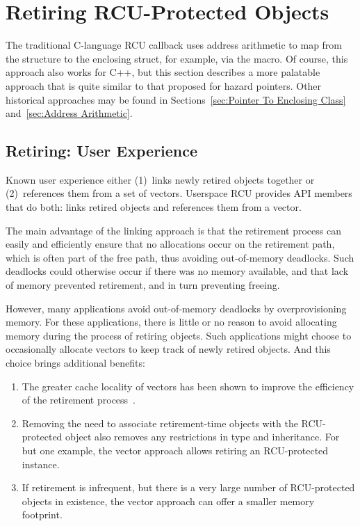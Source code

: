 \documentclass[letterpaper,10pt]{article}
\begin{document}
\section{Retiring RCU-Protected Objects}
\label{sec:Retiring RCU-Protected Objects}

The traditional C-language RCU callback uses address arithmetic
to map from the  structure to the enclosing struct,
for example, via the  macro.
Of course, this approach also works for C++, but this section describes
a more palatable approach that is quite similar to that proposed for
hazard pointers.
Other historical approaches may be found in
Sections~\ref{sec:Pointer To Enclosing Class}
and~\ref{sec:Address Arithmetic}.

\subsection{Retiring: User Experience}
\label{sec:Retiring: User Experience}

Known user experience either (1)~links newly retired
objects together or (2)~references them from a set of vectors.
Userspace RCU provides API members that do both:  
links retired objects and  references them from a
vector.

The main advantage of the linking approach is that the retirement
process can easily and efficiently ensure that no allocations occur on
the retirement path, which is often part of the free path, thus avoiding
out-of-memory deadlocks.
Such deadlocks could otherwise occur if there was no memory available,
and that lack of memory prevented retirement, and in turn preventing freeing.

However, many applications avoid out-of-memory deadlocks by overprovisioning
memory.
For these applications, there is little or no reason to avoid allocating
memory during the process of retiring objects.
Such applications might choose to occasionally allocate vectors to
keep track of newly retired objects.
And this choice brings additional benefits:

\begin{enumerate}
\item	The greater cache locality of vectors has been shown to
	improve the efficiency of the retirement
	process~\cite{MathieuDesnoyers2012URCU}.
\item	Removing the need to associate retirement-time objects with
	the RCU-protected object also removes any restrictions in
	type and inheritance.
	For but one example, the vector approach allows retiring an
	RCU-protected  instance.
\item	If retirement is infrequent, but there is a very large number
	of RCU-protected objects in existence, the vector approach
	can offer a smaller memory footprint.
\end{enumerate}
\end{document}
